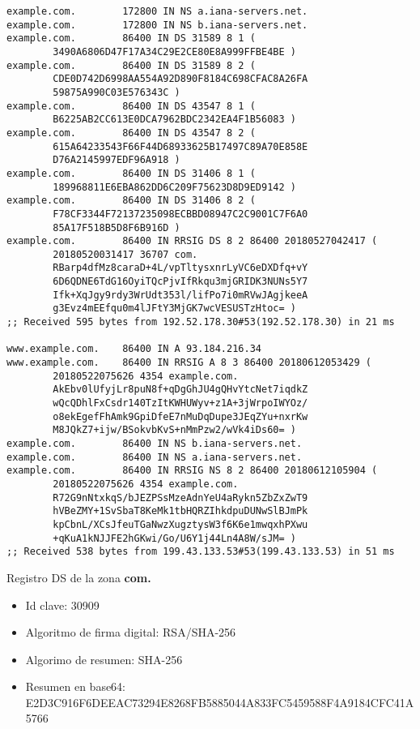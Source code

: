 \documentclass[11pt]{article}
\begin{document}
\begin{lstlisting}
example.com.		172800 IN NS a.iana-servers.net.
example.com.		172800 IN NS b.iana-servers.net.
example.com.		86400 IN DS 31589 8 1 (
        3490A6806D47F17A34C29E2CE80E8A999FFBE4BE )
example.com.		86400 IN DS 31589 8 2 (
        CDE0D742D6998AA554A92D890F8184C698CFAC8A26FA
        59875A990C03E576343C )
example.com.		86400 IN DS 43547 8 1 (
        B6225AB2CC613E0DCA7962BDC2342EA4F1B56083 )
example.com.		86400 IN DS 43547 8 2 (
        615A64233543F66F44D68933625B17497C89A70E858E
        D76A2145997EDF96A918 )
example.com.		86400 IN DS 31406 8 1 (
        189968811E6EBA862DD6C209F75623D8D9ED9142 )
example.com.		86400 IN DS 31406 8 2 (
        F78CF3344F72137235098ECBBD08947C2C9001C7F6A0
        85A17F518B5D8F6B916D )
example.com.		86400 IN RRSIG DS 8 2 86400 20180527042417 (
        20180520031417 36707 com.
        RBarp4dfMz8caraD+4L/vpTltysxnrLyVC6eDXDfq+vY
        6D6QDNE6TdG16OyiTQcPjvIfRkqu3mjGRIDK3NUNs5Y7
        Ifk+XqJgy9rdy3WrUdt353l/lifPo7i0mRVwJAgjkeeA
        g3Evz4mEEfqu0m4lJFtY3MjGK7wcVESUSTzHtoc= )
;; Received 595 bytes from 192.52.178.30#53(192.52.178.30) in 21 ms

www.example.com.	86400 IN A 93.184.216.34
www.example.com.	86400 IN RRSIG A 8 3 86400 20180612053429 (
        20180522075626 4354 example.com.
        AkEbv0lUfyjLr8puN8f+qDgGhJU4gQHvYtcNet7iqdkZ
        wQcQDhlFxCsdr140TzItKWHUWyv+z1A+3jWrpoIWYOz/
        o8ekEgefFhAmk9GpiDfeE7nMuDqDupe3JEqZYu+nxrKw
        M8JQkZ7+ijw/BSokvbKvS+nMmPzw2/wVk4iDs60= )
example.com.		86400 IN NS b.iana-servers.net.
example.com.		86400 IN NS a.iana-servers.net.
example.com.		86400 IN RRSIG NS 8 2 86400 20180612105904 (
        20180522075626 4354 example.com.
        R72G9nNtxkqS/bJEZPSsMzeAdnYeU4aRykn5ZbZxZwT9
        hVBeZMY+1SvSbaT8KeMk1tbHQRZIhkdpuDUNwSlBJmPk
        kpCbnL/XCsJfeuTGaNwzXugztysW3f6K6e1mwqxhPXwu
        +qKuA1kNJJFE2hGKwi/Go/U6Y1j44Ln4A8W/sJM= )
;; Received 538 bytes from 199.43.133.53#53(199.43.133.53) in 51 ms
\end{lstlisting}

\medskip

Registro DS de la zona \textbf{com.}

\begin{itemize}
  \item Id clave: 30909
  \item Algoritmo de firma digital: RSA/SHA-256
  \item Algorimo de resumen: SHA-256
  \item Resumen en base64:\\
    E2D3C916F6DEEAC73294E8268FB5885044A833FC5459588F4A9184CFC41A5766
\end{itemize}
\end{document}
